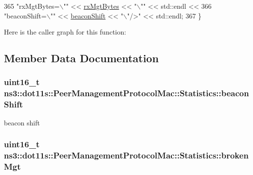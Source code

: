 \begin{DoxyCode}
365   \textcolor{stringliteral}{"rxMgtBytes=\(\backslash\)""} << \hyperlink{structns3_1_1dot11s_1_1PeerManagementProtocolMac_1_1Statistics_adc42ee988c9fedca9588af7e403046f0}{rxMgtBytes} << \textcolor{stringliteral}{"\(\backslash\)""} << std::endl <<
366   \textcolor{stringliteral}{"beaconShift=\(\backslash\)""} << \hyperlink{structns3_1_1dot11s_1_1PeerManagementProtocolMac_1_1Statistics_acef3a393e72e50f8b2e519385976df30}{beaconShift} << \textcolor{stringliteral}{"\(\backslash\)"/>"} << std::endl;
367 \}
\end{DoxyCode}


Here is the caller graph for this function\+:




\subsection{Member Data Documentation}
\subsubsection[{\texorpdfstring{beacon\+Shift}{beaconShift}}]{\setlength{\rightskip}{0pt plus 5cm}uint16\+\_\+t ns3\+::dot11s\+::\+Peer\+Management\+Protocol\+Mac\+::\+Statistics\+::beacon\+Shift}\hypertarget{structns3_1_1dot11s_1_1PeerManagementProtocolMac_1_1Statistics_acef3a393e72e50f8b2e519385976df30}{}\label{structns3_1_1dot11s_1_1PeerManagementProtocolMac_1_1Statistics_acef3a393e72e50f8b2e519385976df30}


beacon shift 

\subsubsection[{\texorpdfstring{broken\+Mgt}{brokenMgt}}]{\setlength{\rightskip}{0pt plus 5cm}uint16\+\_\+t ns3\+::dot11s\+::\+Peer\+Management\+Protocol\+Mac\+::\+Statistics\+::broken\+Mgt}\hypertarget{structns3_1_1dot11s_1_1PeerManagementProtocolMac_1_1Statistics_a7ec552294be33835a15ec7002fe5d723}{}\label{structns3_1_1dot11s_1_1PeerManagementProtocolMac_1_1Statistics_a7ec552294be33835a15ec7002fe5d723}


